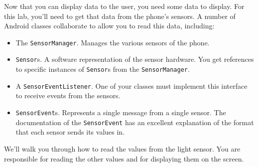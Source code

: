 \documentclass[10pt]{article}
\begin{document}
Now that you can display data to the user, you need some data to display. For this lab, you'll need to get that data from the phone's sensors. A number of Android classes collaborate to allow you to read this data, including:

\begin{itemize}
\item The {\tt SensorManager}. Manages the various sensors of the phone.
\item {\tt Sensor}s. A software representation of the sensor hardware. You get references to specific instances of {\tt Sensor}s from the {\tt SensorManager}.
\item A {\tt SensorEventListener}. One of your classes must implement this interface to receive events from the sensors.
\item {\tt SensorEvent}s. Represents a single message from a single sensor. The documentation of the {\tt SensorEvent} has an excellent explanation of the format that each sensor sends its values in.
\end{itemize}

We'll walk you through how to read the values from the light sensor. You are responsible
for reading the other values and for displaying them on the screen.
\end{document}
